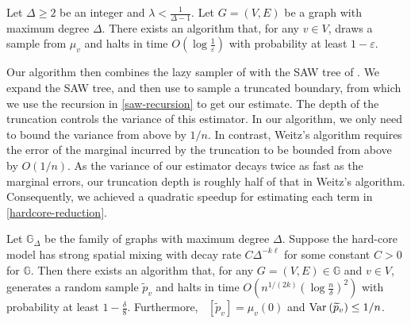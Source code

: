 \documentclass{theoretics}
\newcommand{\htodo}[1]{\todo[color=green!30]{Heng: #1}}
\newcommand{\Ex}{\mathop{\mathbb{{}E}}\nolimits}
\def\=#1{\mathbb{#1}}
\newcommand{\eps}{\varepsilon}
\newcommand{\Var}[2]{\ensuremath{\textnormal{Var}_{#1}\left(#2\right)}}
\begin{document}
\begin{lemma}  \label{lem:truncate-AJ}
  Let $\Delta\ge 2$ be an integer and $\lambda<\frac{1}{\Delta-1}$.
  Let $G=(V,E)$ be a graph with maximum degree $\Delta$.
  There exists an algorithm that, 
  for any $v\in V$,
  draws a sample from $\mu_v$
  and halts in time $O(\log \frac{1}{\eps})$ with probability at least $1-\eps$.
\end{lemma}


Our algorithm then combines the lazy sampler of  with the SAW tree of \cite{Wei06}.
We expand the SAW tree, and then use  to sample a truncated boundary,
from which we use the recursion in \eqref{saw-recursion} to get our estimate.
The depth of the truncation controls the variance of this estimator.
In our algorithm, we only need to bound the variance from above by $1/n$.
In contrast, Weitz's algorithm requires the error of the marginal incurred by the truncation to be bounded from above by $O(1/n)$.
As the variance of our estimator decays twice as fast as the marginal errors,
our truncation depth is roughly half of that in Weitz's algorithm.
Consequently, we achieved a quadratic speedup for estimating each term in \eqref{hardcore-reduction}.

\begin{lemma}
\label{small-lambda-alg}
Let $\=G_{\Delta}$ be the family of graphs with maximum degree $\Delta$.
Suppose the hard-core model has strong spatial mixing with decay rate $C\Delta^{-k\ell}$ for some constant $C>0$ for $\=G$.
Then there exists an algorithm that, for any $G=(V,E)\in\=G$ and $v\in V$, generates a random sample $\widetilde{p}_v$ and halts in time $O(n^{1/(2k)}(\log \frac{n}{\delta})^2)$ with probability at least $1-\frac{\delta}{8}$.
Furthermore, $\Ex[\widetilde{p}_v]=\mu_v(0)$ and $\Var{}{\widetilde{p}_v}\le 1/n$. 
\end{lemma}
\end{document}
